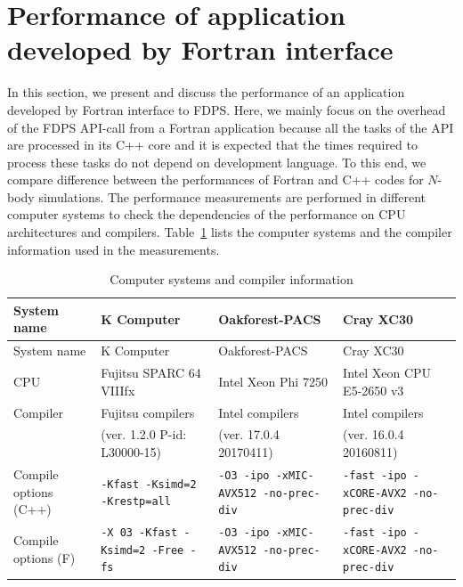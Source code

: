 \documentclass[twocolumn,useamsfonts]{pasj01}
\begin{document}
\section{Performance of application developed by Fortran interface}
\label{sec:performance}
In this section, we present and discuss the performance of an application developed by Fortran interface to FDPS. Here, we mainly focus on the overhead of the FDPS API-call from a Fortran application because all the tasks of the API are processed in its C++ core and it is expected that the times required to process these tasks do not depend on development language. To this end, we compare difference between the performances of Fortran and C++ codes for $N$-body simulations. The performance measurements are performed in different computer systems to check the dependencies of the performance on CPU architectures and compilers. Table~\ref{tbl:computer_systems} lists the computer systems and the compiler information used in the measurements.

\begin{longtable}{l|p{4cm}p{4cm}p{4cm}}
\caption{Computer systems and compiler information}
\label{tbl:computer_systems}
\hline
System name & K Computer & Oakforest-PACS & Cray XC30   \\
\hline\hline
\endfirsthead
System name & K Computer & Oakforest-PACS & Cray XC30   \\
\hline\hline
\endhead
\hline
\endfoot
\hline
\endlastfoot
CPU & Fujitsu SPARC 64 VIIIfx & Intel Xeon Phi 7250 & Intel Xeon CPU E5-2650 v3  \\
Compiler & Fujitsu compilers  & Intel compilers  & Intel compilers  \\
& (ver. 1.2.0 P-id: L30000-15) & (ver. 17.0.4 20170411) & (ver. 16.0.4 20160811) \\
Compile options (C++) & \texttt{-Kfast -Ksimd=2 -Krestp=all} & \texttt{-O3 -ipo -xMIC-AVX512 -no-prec-div} & \texttt{-fast -ipo -xCORE-AVX2 -no-prec-div} \\
Compile options (F) & \texttt{-X 03 -Kfast -Ksimd=2 -Free -fs} & \texttt{-O3 -ipo -xMIC-AVX512 -no-prec-div} & \texttt{-fast -ipo -xCORE-AVX2 -no-prec-div} \\
\end{longtable}
\end{document}
